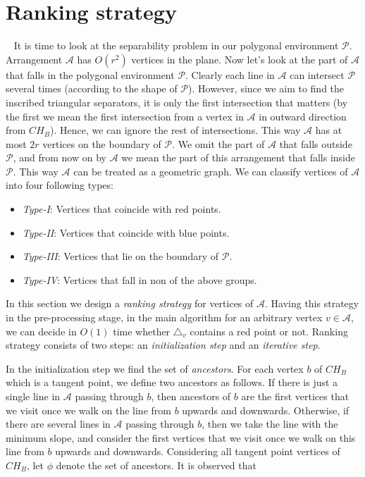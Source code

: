 \documentclass[a4paper,UKenglish]{lipics-v2018}
\theoremstyle{definition}
\begin{document}
\section{Ranking strategy}~\label{sec-rank}
It is time to look at the separability problem in our polygonal environment $\mathcal{P}$.
Arrangement $\mathcal{A}$ has $O(r^2)$ vertices in the plane. Now let's look at the part of $\mathcal{A}$ that falls in the polygonal environment $\mathcal{P}$. Clearly each line in $\mathcal{A}$ can intersect $\mathcal{P}$ several times (according to the shape of $\mathcal{P}$). However, since we aim to find the inscribed triangular separators, it is only the first intersection that matters (by the first  we mean the first intersection  from  a vertex in $\mathcal{A}$ in outward direction from $CH_B$). Hence, we can ignore the rest of intersections. This way $\mathcal{A}$ has at most $2r$ vertices on the boundary of $\mathcal P$.  We omit the part of $\mathcal{A}$ that falls outside $\mathcal P$, and from now on by $\mathcal{A}$ we mean the part of this arrangement that falls inside $\mathcal P$.  This way $\mathcal{A}$ can be treated as a geometric graph. We can classify vertices of $\mathcal{A}$ into four following types:
\begin{itemize}
\item \emph{Type-I}: Vertices that coincide with red points.
\item \emph{Type-II}: Vertices that coincide with blue points.
\item \emph{Type-III}: Vertices that lie on the boundary of $\mathcal P$.
\item \emph{Type-IV}: Vertices that fall in non of the above groups.
\end{itemize}
In this section we design a \emph{ranking strategy} for vertices of $\mathcal{A}$. Having this strategy in the pre-processing stage, in the main algorithm for an arbitrary vertex $v\in \mathcal{A}$, we can decide in $O(1)$ time whether $\triangle_v$ contains a red point or not. Ranking strategy consists of two steps: an \emph{initialization step} and an \emph{iterative step}.

In the initialization step we find the set of \emph{ancestors}. For each vertex $b$  of $CH_B$ which is a tangent point, we define two ancestors as follows. If there is just a single line in $\mathcal{A}$ passing through $b$, then ancestors of $b$ are the first vertices that we visit once we walk on the line from $b$ upwards and downwards. Otherwise, if there are several lines in $\mathcal{A}$ passing through $b$, then we take the line with the minimum slope, and consider the first vertices that we visit once we walk on this line from $b$ upwards and downwards.
Considering all tangent point vertices of $CH_B$, let $\phi$ denote the set of ancestors. It is observed that
\end{document}
